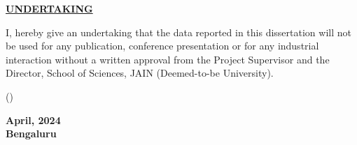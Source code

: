 
\thispagestyle{empty}

\begin{center}

    \Large{\underline{\textbf{UNDERTAKING}}}\\

\end{center}
\vspace{1.5cm}

\noindent

I, \textbf{\auth{}} hereby give an undertaking that the data
reported in this dissertation will not be used for any publication, conference
presentation or for any industrial interaction without a written approval from the Project
Supervisor and the Director, School of Sciences, JAIN (Deemed-to-be University).

\vspace{5cm}

\noindent
\begin{minipage}{0.5\textwidth}

    (\auth)

\end{minipage}%
\begin{minipage}{0.5\textwidth}
    \flushright

    \textbf{April, 2024\\
      Bengaluru}
\end{minipage}

